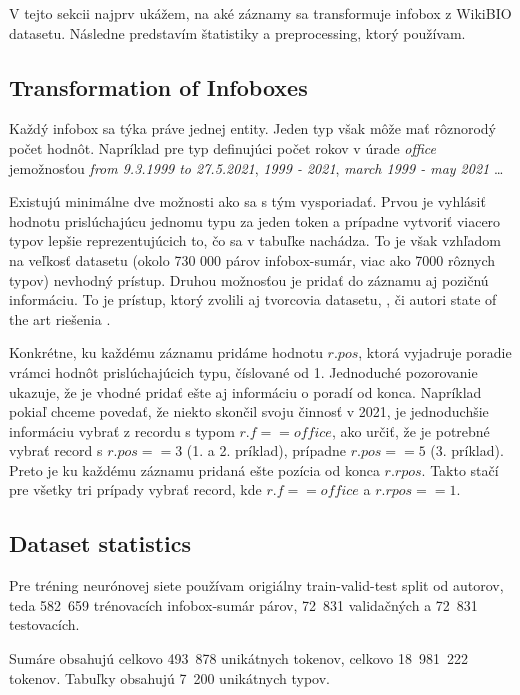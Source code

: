 V tejto sekcii najprv ukážem, na aké záznamy sa transformuje infobox z WikiBIO datasetu. Následne predstavím štatistiky a preprocessing, ktorý používam.

\subsection{Transformation of Infoboxes}

Každý infobox sa týka práve jednej entity. Jeden typ však môže mať rôznorodý počet hodnôt. Napríklad pre typ definujúci počet rokov v úrade \emph{office} je\linebreak[4]možnosťou \emph{from 9.3.1999 to 27.5.2021}, \emph{1999 - 2021}, \emph{march 1999 - may 2021} \dots

Existujú minimálne dve možnosti ako sa s tým vysporiadať. Prvou je vyhlásiť hodnotu prislúchajúcu jednomu typu za jeden token a prípadne vytvoriť viacero typov lepšie reprezentujúcich to, čo sa v tabuľke nachádza. To je však vzhľadom na veľkosť datasetu (okolo 730 000 párov infobox-sumár, viac ako 7000 rôznych typov) nevhodný prístup. Druhou možnosťou je pridať do záznamu aj pozičnú informáciu. To je prístup, ktorý zvolili aj tvorcovia datasetu, \citep{lebret2016neural}, či autori state of the art riešenia \citep{liu2017tabletotext}.

Konkrétne, ku každému záznamu pridáme hodnotu $r.pos$, ktorá vyjadruje poradie vrámci hodnôt prislúchajúcich typu, číslované od 1. Jednoduché pozorovanie ukazuje, že je vhodné pridať ešte aj informáciu o poradí od konca. Napríklad pokiaľ chceme povedať, že niekto skončil svoju činnosť v 2021, je jednoduchšie informáciu vybrať z recordu s typom $r.f == office$, ako určiť, že je potrebné vybrať record s $r.pos == 3$ (1. a 2. príklad), prípadne $r.pos == 5$ (3. príklad). Preto je ku každému záznamu pridaná ešte pozícia od konca $r.rpos$. Takto stačí pre všetky tri prípady vybrať record, kde $r.f == office$ a $r.rpos == 1$.

\subsection{Dataset statistics}

Pre tréning neurónovej siete používam origiálny train-valid-test split od autorov, teda 582~659 trénovacích infobox-sumár párov, 72~831 validačných a 72~831 testovacích.

Sumáre obsahujú celkovo 493~878 unikátnych tokenov, celkovo 18~981~222 tokenov. Tabuľky obsahujú 7~200 unikátnych typov. 

